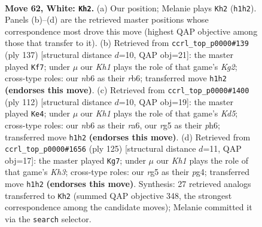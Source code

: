 \documentclass[11pt]{article}
\begin{document}
\clearpage

\begin{figure}[p]\centering
\begin{subfigure}{0.46\textwidth}\centering
\resizebox{\linewidth}{!}{%
\newchessgame
\chessboard[
  setfen={7k/8/1n6/6rp/p2R4/P7/8/7K w - - 1 62},
  showmover=false,
  pgfstyle=straightmove, color=movearrow, markmove={h1-h2}
]}
\caption{}
\end{subfigure}\hfill
\begin{subfigure}{0.46\textwidth}\centering
\resizebox{\linewidth}{!}{%
\newchessgame
\chessboard[
  setfen={8/6k1/PR6/8/6p1/r7/5PK1/8 b - - 25 69},
  showmover=false,
  pgfstyle=straightmove, color=movearrow, markmove={g7-f7}
]}
\caption{}
\end{subfigure}
\\[4pt]
\begin{subfigure}{0.46\textwidth}\centering
\resizebox{\linewidth}{!}{%
\newchessgame
\chessboard[
  setfen={6k1/8/r4p1p/3K3P/8/5R2/8/8 w - - 0 57},
  showmover=false,
  pgfstyle=straightmove, color=movearrow, markmove={d5-e4}
]}
\caption{}
\end{subfigure}\hfill
\begin{subfigure}{0.46\textwidth}\centering
\resizebox{\linewidth}{!}{%
\newchessgame
\chessboard[
  setfen={8/1p6/4K2k/2P5/4N1P1/8/8/2r5 b - - 1 63},
  showmover=false,
  pgfstyle=straightmove, color=movearrow, markmove={h6-g7}
]}
\caption{}
\end{subfigure}
\caption{\textbf{Move 62, White: \texttt{Kh2}.} (a) Our position; Melanie plays \texttt{Kh2} (\texttt{h1h2}). Panels (b)--(d) are the retrieved master positions whose correspondence most drove this move (highest QAP objective among those that transfer to it). (b) Retrieved from \texttt{ccrl\_top\_p0000\#139} (ply 137) [structural distance $d$=10, QAP obj=21]: the master played \texttt{Kf7}; under $\mu$ our \emph{Kh1} plays the role of that game's \emph{Kg2}; cross-type roles: our \emph{n}b6 as their \emph{r}b6; transferred move \texttt{h1h2} \textbf{(endorses this move)}. (c) Retrieved from \texttt{ccrl\_top\_p0000\#1400} (ply 112) [structural distance $d$=10, QAP obj=19]: the master played \texttt{Ke4}; under $\mu$ our \emph{Kh1} plays the role of that game's \emph{Kd5}; cross-type roles: our \emph{n}b6 as their \emph{r}a6, our \emph{r}g5 as their \emph{p}h6; transferred move \texttt{h1h2} \textbf{(endorses this move)}. (d) Retrieved from \texttt{ccrl\_top\_p0000\#1656} (ply 125) [structural distance $d$=11, QAP obj=17]: the master played \texttt{Kg7}; under $\mu$ our \emph{Kh1} plays the role of that game's \emph{Kh3}; cross-type roles: our \emph{r}g5 as their \emph{p}g4; transferred move \texttt{h1h2} \textbf{(endorses this move)}. Synthesis: 27 retrieved analogs transferred to \texttt{Kh2} (summed QAP objective 348, the strongest correspondence among the candidate moves); Melanie committed it via the \texttt{search} selector.}
\label{fig:thought-m122}
\end{figure}
\end{document}
